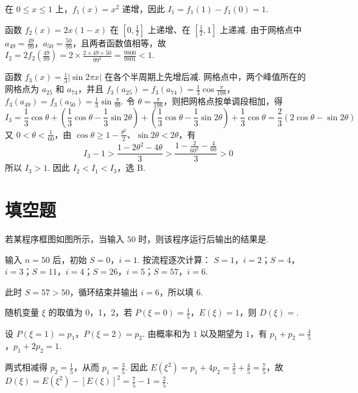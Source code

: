 \begin{solution}
在 \(0\leqslant x\leqslant1\) 上，\(f_1(x)=x^2\) 递增，因此 \(I_1=f_1(1)-f_1(0)=1\).

函数 \(f_2(x)=2x(1-x)\) 在 \([0,\frac12]\) 上递增、在 \([\frac12,1]\) 上递减. 由于网格点中 \(a_{49}=\frac{49}{99}\)，\(a_{50}=\frac{50}{99}\)，且两者函数值相等，故 \(I_2=2f_2\left(\frac{49}{99}\right)=2\times\frac{2\times49\times50}{99^2}=\frac{9800}{9801}<1\).

函数 \(f_3(x)=\frac13|\sin2\pi x|\) 在各个半周期上先增后减. 网格点中，两个峰值所在的网格点为 \(a_{25}\) 和 \(a_{74}\)，并且 \(f_3(a_{25})=f_3(a_{74})=\frac13\cos\frac\pi{198}\)，\(f_3(a_{49})=f_3(a_{50})=\frac13\sin\frac\pi{99}\).
令 \(\theta=\frac\pi{198}\)，则把网格点按单调段相加，得
\[
I_3=\frac13\cos\theta+\left(\frac13\cos\theta-\frac13\sin2\theta\right)+\left(\frac13\cos\theta-\frac13\sin2\theta\right)+\frac13\cos\theta=\frac23\left(2\cos\theta-\sin2\theta\right)
\]
又 \(0<\theta<\frac1{60}\)，由 \(\cos\theta\geqslant1-\frac{\theta^2}{2}\)、\(\sin2\theta<2\theta\)，有
\[
I_3-1>\frac{1-2\theta^2-4\theta}{3}
>\frac{1-\frac{2}{60^2}-\frac{4}{60}}{3}>0
\]
所以 \(I_3>1\). 因此 \(I_2<I_1<I_3\)，选 B.
\end{solution}

\section{填空题}

\begin{problem}
若某程序框图如图所示，当输入 \(50\) 时，则该程序运行后输出的结果是\fillinblank{}.

\end{problem}

\begin{solution}
输入 \(n=50\) 后，初始 \(S=0\)，\(i=1\). 按流程逐次计算：
\(S=1\)，\(i=2\)；\(S=4\)，\(i=3\)；\(S=11\)，\(i=4\)；\(S=26\)，\(i=5\)；\(S=57\)，\(i=6\).

此时 \(S=57>50\)，循环结束并输出 \(i=6\)，所以填 \(6\).
\end{solution}

\begin{problem}
随机变量 \(\xi\) 的取值为 0，1，2，若 \(P(\xi = 0) = \frac{1}{5}\)，\(E(\xi) = 1\)，则 \(D(\xi) =\)\fillinblank{}.
\end{problem}

\begin{solution}
设 \(P(\xi=1)=p_1\)，\(P(\xi=2)=p_2\). 由概率和为 \(1\) 以及期望为 \(1\)，有 \(p_1+p_2=\frac45\)，\(p_1+2p_2=1\).

两式相减得 \(p_2=\frac15\)，从而 \(p_1=\frac35\). 因此 \(E(\xi^2)=p_1+4p_2=\frac35+\frac45=\frac75\)，故 \(D(\xi)=E(\xi^2)-[E(\xi)]^2=\frac75-1=\frac25\).
\end{solution}

